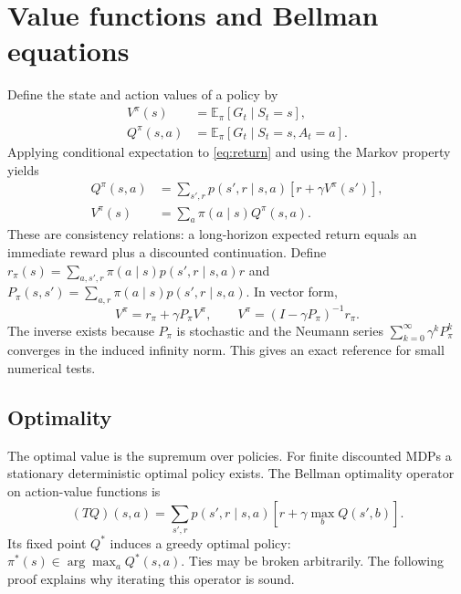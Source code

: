 \documentclass[11pt,a4paper]{article}
\newcommand{\E}{\mathbb E}
\begin{document}
\section{Value functions and Bellman equations}
Define the state and action values of a policy by
\begin{align*}
 V^\pi(s)&=\E_\pi[G_t\mid S_t=s],\\
 Q^\pi(s,a)&=\E_\pi[G_t\mid S_t=s,A_t=a].
\end{align*}
Applying conditional expectation to \eqref{eq:return} and using the Markov property yields
\begin{align}
 Q^\pi(s,a)&=\sum_{s',r}p(s',r\mid s,a)[r+\gamma V^\pi(s')],\\
 V^\pi(s)&=\sum_a\pi(a\mid s)Q^\pi(s,a).
\end{align}
These are consistency relations: a long-horizon expected return equals an immediate reward plus a discounted continuation. Define $r_\pi(s)=\sum_{a,s',r}\pi(a\mid s)p(s',r\mid s,a)r$ and $P_\pi(s,s')=\sum_{a,r}\pi(a\mid s)p(s',r\mid s,a)$. In vector form,
\begin{equation}
 V^\pi=r_\pi+\gamma P_\pi V^\pi,\qquad
 V^\pi=(I-\gamma P_\pi)^{-1}r_\pi.
\end{equation}
The inverse exists because $P_\pi$ is stochastic and the Neumann series $\sum_{k=0}^\infty\gamma^k P_\pi^k$ converges in the induced infinity norm. This gives an exact reference for small numerical tests.

\subsection{Optimality}
The optimal value is the supremum over policies. For finite discounted MDPs a stationary deterministic optimal policy exists. The Bellman optimality operator on action-value functions is
\begin{equation}
 (TQ)(s,a)=\sum_{s',r}p(s',r\mid s,a)\left[r+\gamma\max_b Q(s',b)\right].\label{eq:bellman}
\end{equation}
Its fixed point $Q^*$ induces a greedy optimal policy: $\pi^*(s)\in\arg\max_a Q^*(s,a)$. Ties may be broken arbitrarily. The following proof explains why iterating this operator is sound.
\end{document}
